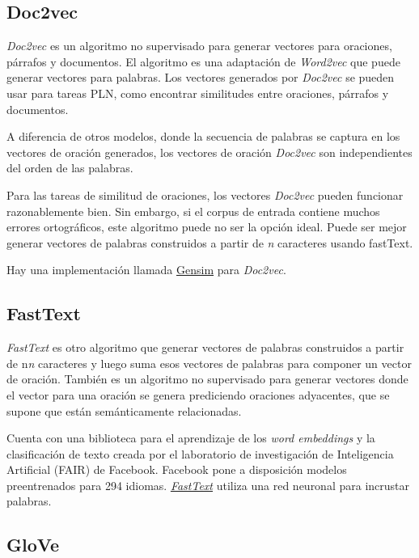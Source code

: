 \documentclass[titlepage]{article}
\begin{document}
\subsection{Doc2vec}

\textit{Doc2vec}\cite{doc2vec} es un algoritmo no supervisado para generar vectores para oraciones, párrafos y documentos. El algoritmo es una adaptación de \textit{Word2vec} que puede generar vectores para palabras. Los vectores generados por \textit{Doc2vec} se pueden usar para tareas PLN, como encontrar similitudes entre oraciones, párrafos y documentos.

A diferencia de otros modelos, donde la secuencia de palabras se captura en los vectores de oración generados, los vectores de oración \textit{Doc2vec} son independientes del orden de las palabras.

Para las tareas de similitud de oraciones, los vectores \textit{Doc2vec} pueden funcionar razonablemente bien. Sin embargo, si el corpus de entrada contiene muchos errores ortográficos, este algoritmo puede no ser la opción ideal. Puede ser mejor generar vectores de palabras construidos a partir de \textit{n} caracteres usando fastText. 

Hay una implementación llamada \href{https://radimrehurek.com/gensim/}{Gensim} para \textit{Doc2vec}.

\subsection{FastText}

\textit{FastText} es otro algoritmo que generar vectores de palabras construidos a partir de n\textit{n} caracteres y luego suma esos vectores de palabras para componer un vector de oración. También es un algoritmo no supervisado para generar vectores donde el vector para una oración se genera prediciendo oraciones adyacentes, que se supone que están semánticamente relacionadas.

\newpage

Cuenta con una biblioteca para el aprendizaje de los \textit{word embeddings} y la clasificación de texto creada por el laboratorio de investigación de Inteligencia Artificial (FAIR) de Facebook. Facebook pone a disposición modelos preentrenados para 294 idiomas. \href{https://techcrunch.com/2016/08/18/facebooks-artificial-intelligence-research-lab-releases-open-source-fasttext-on-github/}{\textit{FastText}} utiliza una red neuronal para incrustar palabras.

\subsection{GloVe}
\end{document}
